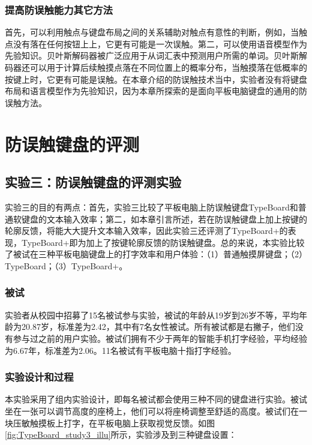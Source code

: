 \subsubsection{提高防误触能力其它方法}

首先，可以利用触点与键盘布局之间的关系辅助对触点有意性的判断，例如，当触点没有落在任何按钮上上，它更有可能是一次误触。第二，可以使用语音模型作为先验知识。贝叶斯解码器被广泛应用于从词汇表中预测用户所需的单词\cite{gong2018wristext, gordon2016watchwriter, gupta2019rotoswype, markussen2014vulture}。贝叶斯解码器还可以用于计算后续触摸点落在不同位置上的概率分布，当触摸落在低概率的按键上时，它更有可能是误触。在本章介绍的防误触技术当中，实验者没有将键盘布局和语言模型作为先验知识，因为本章所探索的是面向平板电脑键盘的通用的防误触方法。

\section{防误触键盘的评测}

\subsection{实验三：防误触键盘的评测实验}

实验三的目的有两点：首先，实验三比较了平板电脑上防误触键盘TypeBoard和普通软键盘的文本输入效率；第二，如本章引言所述，若在防误触键盘上加上按键的轮廓反馈，将能大大提升文本输入效率，因此实验三还评测了TypeBoard+的表现，TypeBoard+即为加上了按键轮廓反馈的防误触键盘。总的来说，本实验比较了被试在三种平板电脑键盘上的打字效率和用户体验：（1）普通触摸屏键盘；（2）TypeBoard；（3）TypeBoard+。

\subsubsection{被试}

实验者从校园中招募了15名被试参与实验，被试的年龄从19岁到26岁不等，平均年龄为20.87岁，标准差为2.42，其中有7名女性被试。所有被试都是右撇子，他们没有参与过之前的用户实验。被试们拥有不少于两年的智能手机打字经验，平均经验为6.67年，标准差为2.06。11名被试有平板电脑十指打字经验。

\subsubsection{实验设计和过程}

本实验采用了组内实验设计，即每名被试都会使用三种不同的键盘进行实验。被试坐在一张可以调节高度的座椅上，他们可以将座椅调整至舒适的高度。被试们在一块压敏触摸板上打字，在平板电脑上获取视觉反馈。如图\ref{fig:TypeBoard_study3_illu}所示，实验涉及到三种键盘设置：

